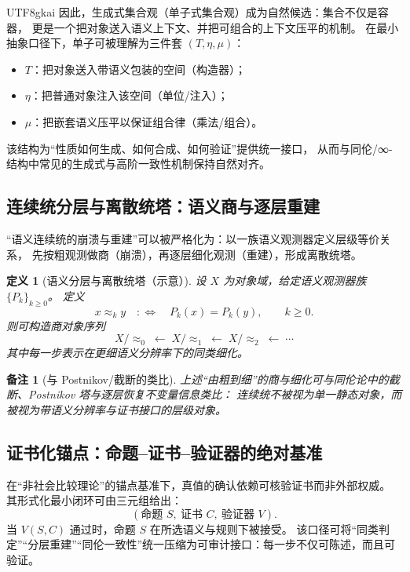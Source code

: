 \documentclass[12pt]{article}
\newtheorem{definition}{定义}[section]
\newtheorem{remark}{备注}[section]
\begin{document}
\begin{CJK*}{UTF8}{gkai}
因此，生成式集合观（单子式集合观）成为自然候选：集合不仅是容器，
更是一个把对象送入语义上下文、并把可组合的上下文压平的机制。
在最小抽象口径下，单子可被理解为三件套 $(T,\eta,\mu)$：\cite{MacLane1998,Moggi1991}
\begin{itemize}
  \item $T$：把对象送入带语义包装的空间（构造器）；
  \item $\eta$：把普通对象注入该空间（单位/注入）；
  \item $\mu$：把嵌套语义压平以保证组合律（乘法/组合）。
\end{itemize}
该结构为“性质如何生成、如何合成、如何验证”提供统一接口，
从而与同伦/∞-结构中常见的生成式与高阶一致性机制保持自然对齐。

\subsection{连续统分层与离散统塔：语义商与逐层重建}
\label{subsec:tex19-continuum-layering}

“语义连续统的崩溃与重建”可以被严格化为：以一族语义观测器定义层级等价关系，
先按粗观测做商（崩溃），再逐层细化观测（重建），形成离散统塔。

\begin{definition}[语义分层与离散统塔（示意）]
设 $X$ 为对象域，给定语义观测器族 $\{P_k\}_{k\ge 0}$。
定义
\[
  x\approx_k y \quad:\Longleftrightarrow\quad P_k(x)=P_k(y),
  \qquad k\ge 0.
\]
则可构造商对象序列
\[
  X/\!\approx_0 \;\longleftarrow\; X/\!\approx_1 \;\longleftarrow\; X/\!\approx_2 \;\longleftarrow\; \cdots
\]
其中每一步表示在更细语义分辨率下的同类细化。
\end{definition}

\begin{remark}[与 Postnikov/截断的类比]
上述“由粗到细”的商与细化可与同伦论中的截断、Postnikov 塔与逐层恢复不变量信息类比：
连续统不被视为单一静态对象，而被视为带语义分辨率与证书接口的层级对象。
\end{remark}

\subsection{证书化锚点：命题--证书--验证器的绝对基准}
\label{subsec:tex19-certificate-anchor}

在“非社会比较理论”的锚点基准下，真值的确认依赖可核验证书而非外部权威。
其形式化最小闭环可由三元组给出：
\[
  (\text{命题 }S,\ \text{证书 }C,\ \text{验证器 }V).
\]
当 $V(S,C)$ 通过时，命题 $S$ 在所选语义与规则下被接受。
该口径可将“同类判定”“分层重建”“同伦一致性”统一压缩为可审计接口：每一步不仅可陈述，而且可验证。


\end{CJK*}
\end{document}
